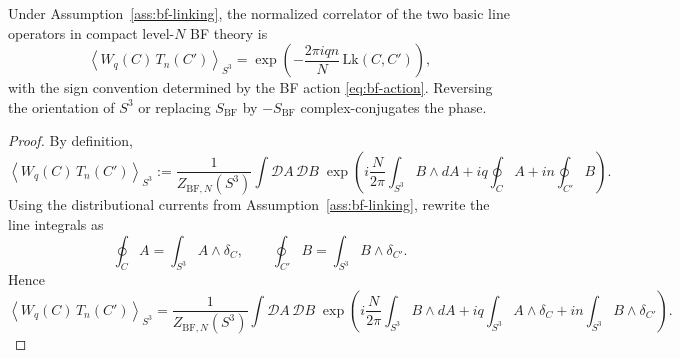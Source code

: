 \begin{proposition}\label{prop:bf-linking}
Under Assumption~\ref{ass:bf-linking}, the normalized correlator of the two basic line operators in compact level-$N$ BF theory is
\begin{equation}\label{eq:bf-linking-phase}
\left\langle W_q(C)\,T_n(C')\right\rangle_{S^3}
=
\exp\!\left(-\frac{2\pi i q n}{N}\,\mathrm{Lk}(C,C')\right),
\end{equation}
with the sign convention determined by the BF action \eqref{eq:bf-action}. Reversing the orientation of $S^3$ or replacing $S_{\mathrm{BF}}$ by $-S_{\mathrm{BF}}$ complex-conjugates the phase.
\end{proposition}

\begin{proof}
By definition,
\begin{equation}\label{eq:bf-correlator-start}
\left\langle W_q(C)\,T_n(C')\right\rangle_{S^3}
:=
\frac{1}{Z_{\mathrm{BF},N}(S^3)}
\int \mathcal{D}A\,\mathcal{D}B\;
\exp\!\left(
i\frac{N}{2\pi}\int_{S^3} B\wedge dA
+
iq\oint_C A
+
in\oint_{C'} B
\right).
\end{equation}
Using the distributional currents from Assumption~\ref{ass:bf-linking}, rewrite the line integrals as
\begin{equation*}
\oint_C A = \int_{S^3} A\wedge \delta_C,
\qquad
\oint_{C'} B = \int_{S^3} B\wedge \delta_{C'}.
\end{equation*}
Hence
\begin{equation}\label{eq:bf-correlator-currents}
\left\langle W_q(C)\,T_n(C')\right\rangle_{S^3}
=
\frac{1}{Z_{\mathrm{BF},N}(S^3)}
\int \mathcal{D}A\,\mathcal{D}B\;
\exp\!\left(
i\frac{N}{2\pi}\int_{S^3} B\wedge dA
+
iq\int_{S^3} A\wedge \delta_C
+
in\int_{S^3} B\wedge \delta_{C'}
\right).
\end{equation}

\medskip


\end{proof}
